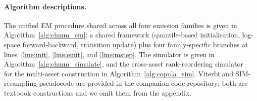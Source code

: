 \paragraph{Algorithm descriptions.}
The unified EM procedure shared across all four emission families is given in Algorithm~\ref{alg:chmm_em}: a shared framework (quantile-based initialisation, log-space forward-backward, transition update) plus four family-specific branches at lines~\ref{line:init}, \ref{line:emit}, and \ref{line:mstep}. The simulator is given in Algorithm~\ref{alg:chmm_simulate}, and the cross-asset rank-reordering simulator for the multi-asset construction in Algorithm~\ref{alg:copula_sim}. Viterbi and SIM-resampling pseudocode are provided in the companion code repository; both are textbook constructions and we omit them from the appendix.

